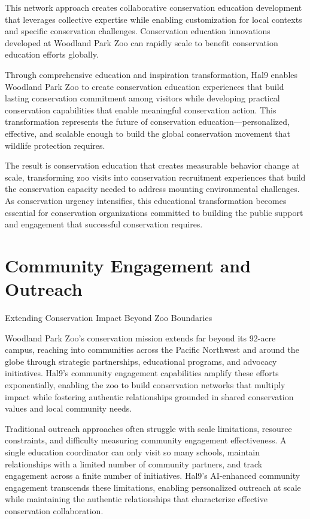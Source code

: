 \documentclass[
  Letterpaper,
]{scrbook}
\begin{document}
This network approach creates collaborative conservation education
development that leverages collective expertise while enabling
customization for local contexts and specific conservation challenges.
Conservation education innovations developed at Woodland Park Zoo can
rapidly scale to benefit conservation education efforts globally.

Through comprehensive education and inspiration transformation, Hal9
enables Woodland Park Zoo to create conservation education experiences
that build lasting conservation commitment among visitors while
developing practical conservation capabilities that enable meaningful
conservation action. This transformation represents the future of
conservation education---personalized, effective, and scalable enough to
build the global conservation movement that wildlife protection
requires.

The result is conservation education that creates measurable behavior
change at scale, transforming zoo visits into conservation recruitment
experiences that build the conservation capacity needed to address
mounting environmental challenges. As conservation urgency intensifies,
this educational transformation becomes essential for conservation
organizations committed to building the public support and engagement
that successful conservation requires.


\chapter{Community Engagement and
Outreach}\label{community-engagement-and-outreach}

Extending Conservation Impact Beyond Zoo Boundaries

\hfill\break

Woodland Park Zoo's conservation mission extends far beyond its 92-acre
campus, reaching into communities across the Pacific Northwest and
around the globe through strategic partnerships, educational programs,
and advocacy initiatives. Hal9's community engagement capabilities
amplify these efforts exponentially, enabling the zoo to build
conservation networks that multiply impact while fostering authentic
relationships grounded in shared conservation values and local community
needs.

Traditional outreach approaches often struggle with scale limitations,
resource constraints, and difficulty measuring community engagement
effectiveness. A single education coordinator can only visit so many
schools, maintain relationships with a limited number of community
partners, and track engagement across a finite number of initiatives.
Hal9's AI-enhanced community engagement transcends these limitations,
enabling personalized outreach at scale while maintaining the authentic
relationships that characterize effective conservation collaboration.
\end{document}
